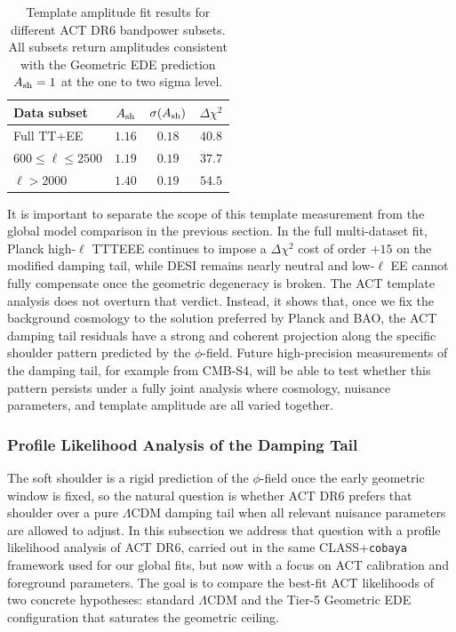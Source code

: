 \documentclass[a4paper,11pt]{article}
\begin{document}
\begin{table}[h]
\centering
\caption{Template amplitude fit results for different ACT DR6 bandpower subsets. All subsets return amplitudes consistent with the Geometric EDE prediction $A_{\rm sh}=1$ at the one to two sigma level.}
\label{tab:template_robustness}
\begin{tabular}{lccc}
\toprule
\textbf{Data subset} & $A_{\rm sh}$ & $\sigma(A_{\rm sh})$ & $\Delta\chi^2$ \\
\midrule
Full TT+EE & $1.16$ & $0.18$ & $40.8$ \\
$600 \le \ell \le 2500$ & $1.19$ & $0.19$ & $37.7$ \\
$\ell > 2000$ & $1.40$ & $0.19$ & $54.5$ \\
\bottomrule
\end{tabular}
\end{table}

It is important to separate the scope of this template measurement from the global model comparison in the previous section. In the full multi-dataset fit, Planck high-$\ell$ TTTEEE continues to impose a $\Delta\chi^2$ cost of order $+15$ on the modified damping tail, while DESI remains nearly neutral and low-$\ell$ EE cannot fully compensate once the geometric degeneracy is broken. The ACT template analysis does not overturn that verdict. Instead, it shows that, once we fix the background cosmology to the solution preferred by Planck and BAO, the ACT damping tail residuals have a strong and coherent projection along the specific shoulder pattern predicted by the $\phi$-field. Future high-precision measurements of the damping tail, for example from CMB-S4, will be able to test whether this pattern persists under a fully joint analysis where cosmology, nuisance parameters, and template amplitude are all varied together.

\subsubsection{Profile Likelihood Analysis of the Damping Tail}
\label{sec:profile_likelihood}

The soft shoulder is a rigid prediction of the $\phi$-field once the early geometric window is fixed, so the natural question is whether ACT DR6 prefers that shoulder over a pure $\Lambda$CDM damping tail when all relevant nuisance parameters are allowed to adjust. In this subsection we address that question with a profile likelihood analysis of ACT DR6, carried out in the same CLASS+\texttt{cobaya} framework used for our global fits, but now with a focus on ACT calibration and foreground parameters. The goal is to compare the best-fit ACT likelihoods of two concrete hypotheses: standard $\Lambda$CDM and the Tier-5 Geometric EDE configuration that saturates the geometric ceiling.
\end{document}
